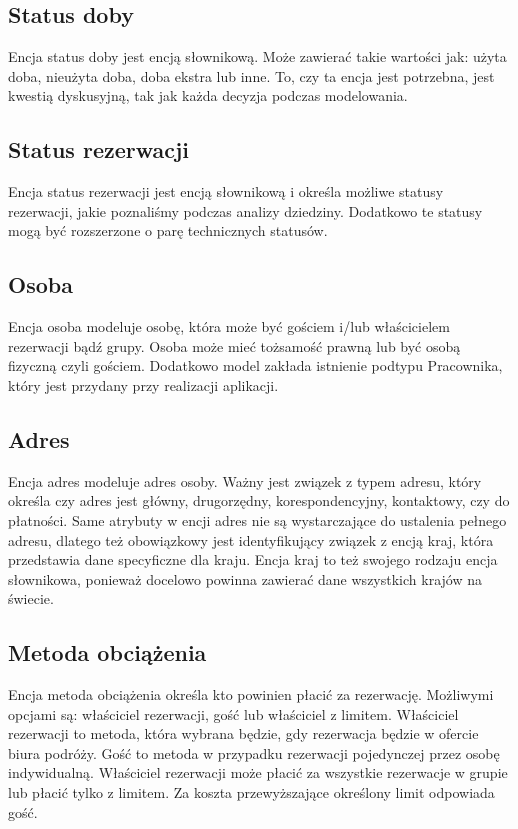 \documentclass[a4paper,onecolumn,oneside,11pt,wide,floatssmall]{mwrep}
\theoremstyle{definition}
\theoremstyle{plain}%
\theoremstyle{remark}
\begin{document}
\subsection{Status doby}
Encja status doby jest encją słownikową. Może zawierać takie wartości jak: użyta doba, nieużyta doba, doba ekstra lub inne. To, czy ta encja jest potrzebna, jest kwestią dyskusyjną, tak jak każda decyzja podczas modelowania.

\subsection{Status rezerwacji}
Encja status rezerwacji jest encją słownikową i określa możliwe statusy rezerwacji, jakie poznaliśmy podczas analizy dziedziny. Dodatkowo te statusy mogą być rozszerzone o parę technicznych statusów.

\subsection{Osoba}
Encja osoba modeluje osobę, która może być gościem i/lub właścicielem rezerwacji bądź grupy. Osoba może mieć tożsamość prawną lub być osobą fizyczną czyli gościem. Dodatkowo model zakłada istnienie podtypu Pracownika, który jest przydany przy realizacji aplikacji. 

\subsection{Adres}
Encja adres modeluje adres osoby. Ważny jest związek z typem adresu, który określa czy adres jest główny, drugorzędny, korespondencyjny, kontaktowy, czy do płatności. Same atrybuty w encji adres nie są wystarczające do ustalenia pełnego adresu, dlatego też obowiązkowy jest identyfikujący związek z encją kraj, która przedstawia dane specyficzne dla kraju. Encja kraj to też swojego rodzaju encja słownikowa, ponieważ docelowo powinna zawierać dane wszystkich krajów na świecie.

\subsection{Metoda obciążenia}
Encja metoda obciążenia określa kto powinien płacić za rezerwację. Możliwymi opcjami są: właściciel rezerwacji, gość lub właściciel z limitem. Właściciel rezerwacji to metoda, która wybrana będzie, gdy rezerwacja będzie w ofercie biura podróży. Gość to metoda w przypadku rezerwacji pojedynczej przez osobę indywidualną. Właściciel rezerwacji może płacić za wszystkie rezerwacje w grupie lub płacić tylko z limitem. Za koszta przewyższające określony limit odpowiada gość. 
\end{document}
